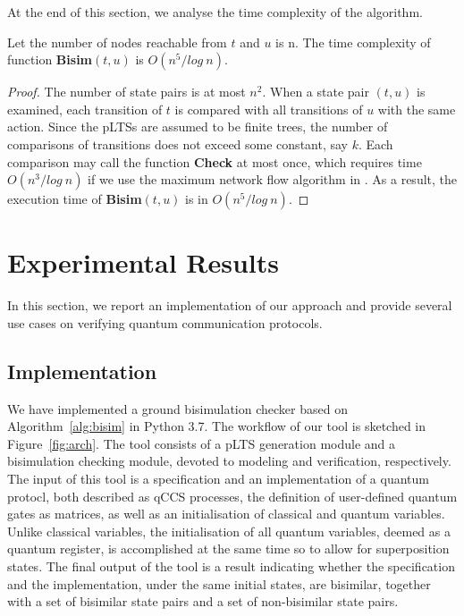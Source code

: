 \documentclass[a4paper,UKenglish,cleveref, autoref]{lipics-v2019}
\begin{document}
At the end of this section, we analyse the time complexity of the algorithm.

\begin{theorem}[Complexity]
Let the number of nodes reachable from $t$ and $u$ is n. The time complexity of function \textbf{Bisim}$(t,u)$ is $O(n^5/log\ n)$. %
\end{theorem}
\begin{proof}
 The number of state pairs is at most $n^2$. When a state pair $(t,u)$ is examined, each transition of $t$ is compared with all transitions of $u$ with the same action. Since the pLTSs are assumed to be finite trees, the number of comparisons of transitions does not exceed some constant, say $k$. Each comparison may call the function \textbf{Check} at most once, which requires time $O(n^3/log\ n)$ if we use the maximum network flow algorithm in \cite{CHM90}. As a result, the execution time of \textbf{Bisim}$(t,u)$ is in $O(n^5/log\ n)$.
\end{proof}

\section{Experimental Results}
\label{sec:experiment}
In this section, we report an implementation of our approach and provide several use cases on verifying quantum communication protocols. 
\subsection{Implementation}
We have implemented a ground bisimulation checker based on Algorithm~\ref{alg:bisim} in Python 3.7. The workflow of our tool is sketched in Figure~\ref{fig:arch}. The tool consists of a pLTS generation module and a bisimulation checking module, devoted to modeling and verification, respectively.
The input of this tool is a specification and an implementation of a quantum protocl, both described as qCCS processes, the definition of user-defined quantum gates  as matrices, as well as an initialisation of classical and quantum variables. Unlike classical variables, the initialisation of all quantum variables, deemed as a quantum register, is accomplished at the same time so to allow for superposition states.
The final output of the tool is a result indicating whether the specification and the implementation, under the same initial states, are bisimilar, together with a set of bisimilar state pairs and  a set of non-bisimilar state pairs.
%
\end{document}

